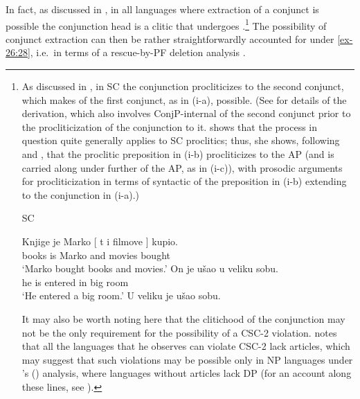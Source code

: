 \documentclass[output=paper]{langsci/langscibook}
\begin{document}
\largerpage
In fact, as discussed in \textcite{Oda:2017}, in all languages where extraction
of a conjunct is possible the conjunction head is a clitic that
undergoes .\footnote{As discussed in \textcite{Stjepanovic2014},
    in \gls{SC} the conjunction procliticizes to the second
    conjunct, which makes  of the first conjunct, as in (i-a),
    possible. (See \citealt{Stjepanovic2014} for details of the derivation,
    which also involves ConjP-internal  of the second conjunct
    prior to the procliticization of the conjunction to it.
    \citeauthor{Stjepanovic2014} shows that the process in question quite
    generally applies to \gls{SC} proclitics; thus, she shows,
    following \citealt{Boskovic2013b} and \citealt{Talic2014}, that the
    proclitic preposition in (i-b) procliticizes to the AP (and is
    carried along under further  of the AP, as in (i-c)), with
     prosodic arguments for procliticization in
    terms of syntactic  of the preposition in (i-b) extending to
    the conjunction in (i-a).)

\begin{exe}
 \glsdesc{SC}
    \begin{xlist}
	\ex\gll {}Knjige je Marko [ t i filmove ] kupio.\\
            books is Marko {} {} and movies {} bought\\
	\glt    \enquote*{Marko bought books and movies.}
	\ex\gll On  je  ušao  u  veliku  sobu.\\
			he is entered in big room\\
	\glt \enquote*{He entered a big room.}
	\ex U veliku je ušao sobu.
    \end{xlist}
\end{exe}

It may also be worth noting here that the clitichood of the conjunction may not
be the only requirement for the possibility of a CSC-2 violation.
\citeauthor{Oda:2017} notes that all the languages that he observes can
violate CSC-2 lack articles, which may suggest that such violations may be
possible only in NP languages under \citeauthor{Boskovic2008}’s
(\citeyear{Boskovic2008,Boskovic2012}) analysis, where languages without
articles lack DP (for an account along these lines, see
\citealt{Boskovic2017}).\label{fn:24}} The possibility of conjunct extraction
can then be rather straightforwardly accounted for under \eqref{ex-26:28}, i.e.\ in terms
of a rescue-by-\gls{PF} deletion analysis
\parencite[see][]{Oda:2017,Stjepanovic2014}.
\end{document}
